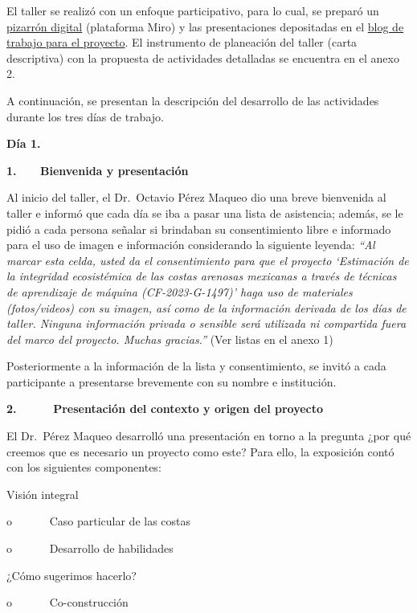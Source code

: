 \documentclass[
  letterpaper,
  DIV=11,
  numbers=noendperiod]{scrreprt}
\begin{document}
El taller se realizó con un enfoque participativo, para lo cual, se
preparó un
\href{https://miro.com/welcomeonboard/ckhlZ3lXY1djM0FXd3ZIZmlpV3FUVXFONGJsUFJ0NGFIaWw0eGdHOHBDalhDdFk1Zjg1MUVOZTNMUmZaNDhPVHwzMDc0NDU3MzUyMDM4MTIwMjcwfDI=?share_link_id=865983900620}{pizarrón
digital} (plataforma Miro) y las presentaciones depositadas en el
\href{https://sw-costas-arenosas.netlify.app/presentaciones\#category=presentaci\%C3\%B3n}{blog
de trabajo para el proyecto}. El instrumento de planeación del taller
(carta descriptiva) con la propuesta de actividades detalladas se
encuentra en el anexo 2.

A continuación, se presentan la descripción del desarrollo de las
actividades durante los tres días de trabajo.

\textbf{Día 1.}

\textbf{1.~~~ Bienvenida y presentación}

Al inicio del taller, el Dr.~Octavio Pérez Maqueo dio una breve
bienvenida al taller e informó que cada día se iba a pasar una lista de
asistencia; además, se le pidió a cada persona señalar si brindaban su
consentimiento libre e informado para el uso de imagen e información
considerando la siguiente leyenda: \emph{``Al marcar esta celda, usted
da el consentimiento para que el proyecto `Estimación de la integridad
ecosistémica de las costas arenosas mexicanas a través de técnicas de
aprendizaje de máquina (CF-2023-G-1497)' haga uso de materiales
(fotos/videos) con su imagen, así como de la información derivada de los
días de taller. Ninguna información privada o sensible será utilizada ni
compartida fuera del marco del proyecto. Muchas gracias.''} (Ver listas
en el anexo 1)

Posteriormente a la información de la lista y consentimiento, se invitó
a cada participante a presentarse brevemente con su nombre e
institución.

\textbf{2.~~~~~ Presentación del contexto y origen del proyecto}

El Dr.~Pérez Maqueo desarrolló una presentación en torno a la pregunta
¿por qué creemos que es necesario un proyecto como este? Para ello, la
exposición contó con los siguientes componentes:

Visión integral

o~~~~~~ Caso particular de las costas

o~~~~~~ Desarrollo de habilidades

¿Cómo sugerimos hacerlo?

o~~~~~~ Co-construcción
\end{document}
